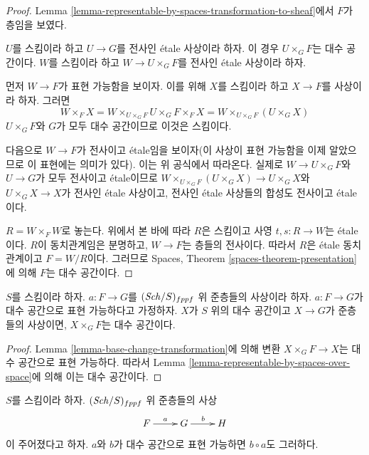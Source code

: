 \begin{proof}
Lemma \ref{lemma-representable-by-spaces-transformation-to-sheaf}에서
$F$가 층임을 보였다.

\medskip\noindent
$U$를 스킴이라 하고 $U \to G$를 전사인 \'etale 사상이라 하자.
이 경우 $U \times_G F$는 대수 공간이다. $W$를 스킴이라 하고
$W \to U \times_G F$를 전사인 \'etale 사상이라 하자.

\medskip\noindent
먼저 $W \to F$가 표현 가능함을 보이자. 이를 위해 $X$를 스킴이라 하고
$X \to F$를 사상이라 하자. 그러면
$$
W \times_F X = W \times_{U \times_G F} U \times_G F \times_F X
= W \times_{U \times_G F} (U \times_G X)
$$
$U \times_G F$와 $G$가 모두 대수 공간이므로 이것은 스킴이다.

\medskip\noindent
다음으로 $W \to F$가 전사이고 \'etale임을 보이자(이 사상이 표현
가능함을 이제 알았으므로 이 표현에는 의미가 있다). 이는 위 공식에서
따라온다. 실제로 $W \to U \times_G F$와 $U \to G$가 모두 전사이고
\'etale이므로
$W \times_{U \times_G F} (U \times_G X) \to U \times_G X$와
$U \times_G X \to X$가 전사인 \'etale 사상이고, 전사인 \'etale
사상들의 합성도 전사이고 \'etale이다.

\medskip\noindent
$R = W \times_F W$로 놓는다. 위에서 본 바에 따라 $R$은 스킴이고
사영 $t, s : R \to W$는 \'etale이다. $R$이 동치관계임은 분명하고,
$W \to F$는 층들의 전사이다. 따라서 $R$은 \'etale 동치관계이고
$F = W/R$이다. 그러므로 Spaces,
Theorem \ref{spaces-theorem-presentation}에 의해 $F$는 대수 공간이다.
\end{proof}

\begin{lemma}
\label{lemma-representable-by-spaces}
$S$를 스킴이라 하자.
$a : F \to G$를 $(\mathit{Sch}/S)_{fppf}$ 위 준층들의 사상이라 하자.
$a : F \to G$가 대수 공간으로 표현 가능하다고 가정하자.
$X$가 $S$ 위의 대수 공간이고 $X \to G$가 준층들의 사상이면,
$X \times_G F$는 대수 공간이다.
\end{lemma}

\begin{proof}
Lemma \ref{lemma-base-change-transformation}에 의해 변환
$X \times_G F \to X$는 대수 공간으로 표현 가능하다. 따라서
Lemma \ref{lemma-representable-by-spaces-over-space}에 의해 이는
대수 공간이다.
\end{proof}

\begin{lemma}
\label{lemma-composition-transformation}
$S$를 스킴이라 하자. $(\mathit{Sch}/S)_{fppf}$ 위 준층들의 사상
$$
\xymatrix{
F \ar[r]^a & G \ar[r]^b & H
}
$$
이 주어졌다고 하자. $a$와 $b$가 대수 공간으로 표현 가능하면
$b \circ a$도 그러하다.
\end{lemma}

